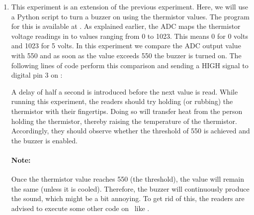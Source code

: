 \begin{enumerate}
  \item This experiment is an extension of the previous
        experiment. Here, we will use a Python script to
        turn a buzzer on using the thermistor values.
        The program for this is available at
        .  As explained earlier,
        the ADC maps the thermistor voltage readings in to values
        ranging from 0 to 1023. This means 0 for 0 volts and 1023 for 5
        volts. In this experiment we compare the ADC output value with 550
        and as soon as the value exceeds 550 the buzzer is turned on. The following lines of code perform this
        comparison and sending a {HIGH} signal to digital pin 3 on \arduino:
        
        A delay of half a second is introduced
        before the next value is read. While running this experiment,
        the readers should try holding (or rubbing) the thermistor with their fingertips.
        Doing so will transfer heat from the person holding the
        thermistor, thereby raising the temperature of the thermistor.
        Accordingly, they should observe whether the threshold of 550 is achieved
        and the buzzer is enabled.

        \paragraph{Note:} Once the thermistor value reaches 550 (the threshold), the value will remain the same
        (unless it is cooled). Therefore, the buzzer will continuously produce the sound, which might be
        a bit annoying. To get rid of this, the readers are advised to
        execute some other code on \arduino\ like .

\end{enumerate}


